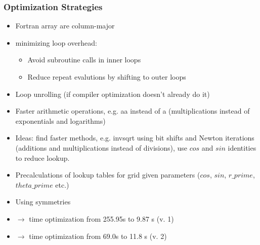 \documentclass{beamer}
\begin{document}
\begin{frame}
 \frametitle{Optimization Strategies}
 \begin{itemize}
  \item Fortran array are column-major
  \item minimizing loop overhead:
  \begin{itemize}
   \item Avoid subroutine calls in inner loops
   \item Reduce repeat evalutions by shifting to outer loops
  \end{itemize}
  \item Loop unrolling (if compiler optimization doesn't already do it)
  \item Faster arithmetic operations, e.g. a\textasteriskcentered a instead of a\textasteriskcentered{} (multiplications instead of exponentials and logarithms)
  \item Ideas: find faster methods, e.g. invsqrt using bit shifts and Newton iterations (additions and multiplications instead of divisions), use $cos$ and $sin$ identities to reduce lookup.
  \item Precalculations of lookup tables for grid given parameters ($cos$, $sin$, $r\_prime$, $theta\_prime$ etc.)
  \item Using symmetries
 
 \item[] $\longrightarrow$ time optimization from 255.95s to 9.87 s (v. 1)
 \item[] $\longrightarrow$ time optimization from 69.0s to 11.8 s (v. 2)
\end{itemize}
\end{frame}
\end{document}

